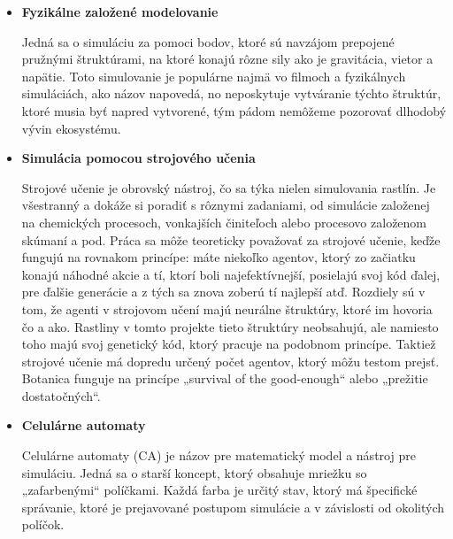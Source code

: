 \documentclass[12pt]{article}
\begin{document}
\begin{itemize}
	\item \textbf{Fyzikálne založené modelovanie}

	Jedná sa o simuláciu za pomoci bodov, ktoré sú navzájom prepojené pružnými
	štruktúrami, na ktoré konajú rôzne sily ako je gravitácia, vietor
	a napätie. Toto simulovanie je populárne najmä vo filmoch a fyzikálnych
	simuláciách, ako názov napovedá, no neposkytuje vytváranie týchto štruktúr,
	ktoré musia byť napred vytvorené, tým pádom nemôžeme pozorovať dlhodobý
	vývin ekosystému.

	\item \textbf{Simulácia pomocou strojového učenia}

	Strojové učenie je obrovský nástroj, čo sa týka nielen simulovania rastlín.
	Je všestranný a dokáže si poradiť s rôznymi zadaniami, od simulácie
	založenej na chemických procesoch, vonkajších činiteľoch alebo
	procesovo %
	založenom skúmaní a pod.
	Práca %
	sa môže teoreticky považovať za strojové
	učenie, keďže fungujú na rovnakom princípe: máte niekoľko agentov, ktorý
	zo začiatku konajú náhodné akcie a tí, ktorí boli najefektívnejší,
	posielajú svoj kód ďalej, pre ďalšie generácie a z tých sa znova zoberú
	tí najlepší atď.
	Rozdiely %
	sú v tom, že agenti v strojovom učení majú
	neurálne štruktúry, ktoré im hovoria čo a ako. Rastliny v tomto projekte
	tieto štruktúry neobsahujú, ale namiesto toho majú svoj genetický kód,
	ktorý pracuje na podobnom princípe.
	Taktiež %
	strojové učenie má dopredu
	určený počet agentov, ktorý môžu testom prejsť. Botanica funguje na
	princípe „survival of the good-enough“ alebo „prežitie dostatočných“.

	\item \textbf{Celulárne automaty}

	Celulárne automaty (CA) je názov pre matematický model a nástroj pre
	simuláciu. Jedná sa o starší koncept, ktorý obsahuje
	mriežku %
	so „zafarbenými“ políčkami. Každá farba je určitý stav, ktorý má špecifické
	správanie, ktoré je prejavované postupom simulácie a v závislosti od
	okolitých políčok.

\end{itemize}
\end{document}
